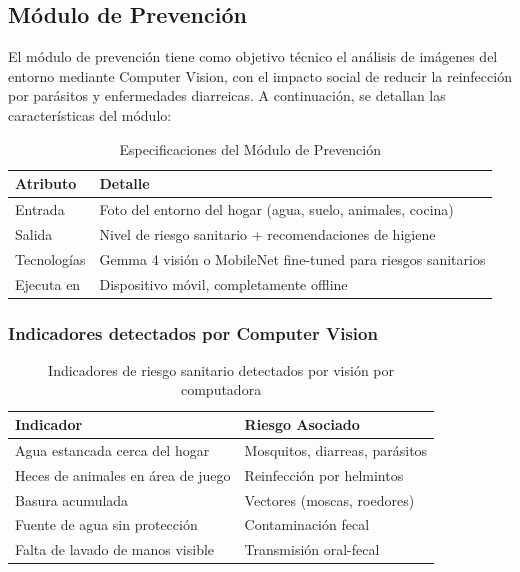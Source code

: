 \subsection{Módulo de Prevención}
\label{sec:modulo_prevencion}

El módulo de prevención tiene como objetivo técnico el análisis de imágenes del entorno mediante Computer Vision, con el impacto social de reducir la reinfección por parásitos y enfermedades diarreicas. A continuación, se detallan las características del módulo:

\begin{table}[H]
\centering
\small
\begin{tabular}{|l|p{6cm}|}
\hline
\textbf{Atributo} & \textbf{Detalle} \\
\hline
Entrada & Foto del entorno del hogar (agua, suelo, animales, cocina) \\
\hline
Salida & Nivel de riesgo sanitario + recomendaciones de higiene \\
\hline
Tecnologías & Gemma 4 visión o MobileNet fine-tuned para riesgos sanitarios \\
\hline
Ejecuta en & Dispositivo móvil, completamente offline \\
\hline
\end{tabular}
\caption{Especificaciones del Módulo de Prevención}
\label{tab:modulo_prevencion}
\end{table}

\subsubsection{Indicadores detectados por Computer Vision}

\begin{table}[H]
\centering
\small
\begin{tabular}{|l|l|}
\hline
\textbf{Indicador} & \textbf{Riesgo Asociado} \\
\hline
Agua estancada cerca del hogar & Mosquitos, diarreas, parásitos \\
\hline
Heces de animales en área de juego & Reinfección por helmintos \\
\hline
Basura acumulada & Vectores (moscas, roedores) \\
\hline
Fuente de agua sin protección & Contaminación fecal \\
\hline
Falta de lavado de manos visible & Transmisión oral-fecal \\
\hline
\end{tabular}
\caption{Indicadores de riesgo sanitario detectados por visión por computadora}
\label{tab:indicadores_riesgo}
\end{table}

